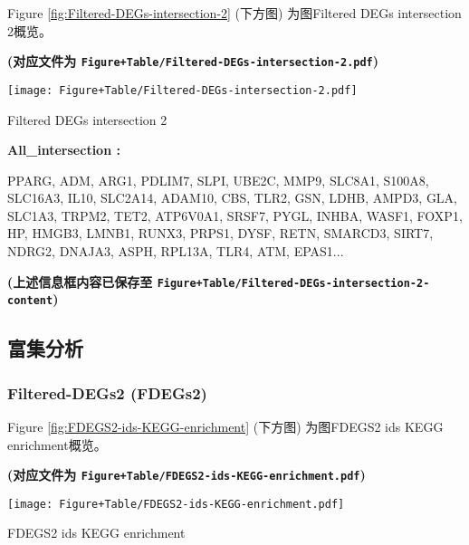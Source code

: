 \documentclass[
]{article}
\begin{document}
Figure \ref{fig:Filtered-DEGs-intersection-2} (下方图) 为图Filtered DEGs intersection 2概览。

\textbf{(对应文件为 \texttt{Figure+Table/Filtered-DEGs-intersection-2.pdf})}

\def\@captype{figure}
\begin{center}
\texttt{[image: Figure+Table/Filtered-DEGs-intersection-2.pdf]}
\caption{Filtered DEGs intersection 2}\label{fig:Filtered-DEGs-intersection-2}
\end{center}
\begin{center}\begin{tcolorbox}[colback=gray!10, colframe=gray!50, width=0.9\linewidth, arc=1mm, boxrule=0.5pt]
\textbf{
All\_intersection
:}

\vspace{0.5em}

    PPARG, ADM, ARG1, PDLIM7, SLPI, UBE2C, MMP9, SLC8A1,
S100A8, SLC16A3, IL10, SLC2A14, ADAM10, CBS, TLR2, GSN,
LDHB, AMPD3, GLA, SLC1A3, TRPM2, TET2, ATP6V0A1, SRSF7,
PYGL, INHBA, WASF1, FOXP1, HP, HMGB3, LMNB1, RUNX3, PRPS1,
DYSF, RETN, SMARCD3, SIRT7, NDRG2, DNAJA3, ASPH, RPL13A,
TLR4, ATM, EPAS1...

\vspace{2em}
\end{tcolorbox}
\end{center}

\textbf{(上述信息框内容已保存至 \texttt{Figure+Table/Filtered-DEGs-intersection-2-content})}

\hypertarget{ux5bccux96c6ux5206ux6790-1}{%
\subsection{富集分析}\label{ux5bccux96c6ux5206ux6790-1}}

\hypertarget{filtered-degs2-fdegs2}{%
\subsubsection{Filtered-DEGs2 (FDEGs2)}\label{filtered-degs2-fdegs2}}

Figure \ref{fig:FDEGS2-ids-KEGG-enrichment} (下方图) 为图FDEGS2 ids KEGG enrichment概览。

\textbf{(对应文件为 \texttt{Figure+Table/FDEGS2-ids-KEGG-enrichment.pdf})}

\def\@captype{figure}
\begin{center}
\texttt{[image: Figure+Table/FDEGS2-ids-KEGG-enrichment.pdf]}
\caption{FDEGS2 ids KEGG enrichment}\label{fig:FDEGS2-ids-KEGG-enrichment}
\end{center}
\end{document}
